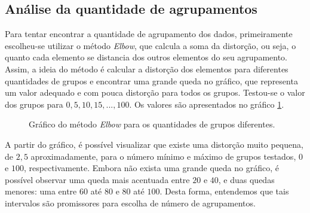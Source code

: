 \documentclass[conference]{IEEEtran}
\begin{document}
\subsection{Análise da quantidade de agrupamentos}

Para tentar encontrar a quantidade de agrupamento dos dados, primeiramente escolheu-se utilizar o método \emph{Elbow}, que calcula a soma da distorção, ou seja, o quanto cada elemento se distancia dos outros elementos do seu agrupamento. Assim, a ideia do método é calcular a distorção dos elementos para diferentes quantidades de grupos e encontrar uma grande queda no gráfico, que representa um valor adequado e com pouca distorção para todos os grupos. Testou-se o valor dos grupos para $0, 5, 10, 15, ..., 100$. Os valores são apresentados no gráfico \ref{fig:elbow}.

\begin{figure}[!h]
	\centering
	{
	}
	\caption{\small Gráfico do método \emph{Elbow} para os quantidades de grupos diferentes.}
	\label{fig:elbow}
\end{figure}

A partir do gráfico, é possível visualizar que existe uma distorção muito pequena, de $2,5$ aproximadamente, para o número mínimo e máximo de grupos testados, $0$ e $100$, respectivamente. Embora não exista uma grande queda no gráfico, é possível observar uma queda mais acentuada entre $20$ e $40$, e duas quedas menores: uma entre $60$ até $80$ e $80$ até $100$. Desta forma, entendemos que tais intervalos são promissores para escolha de número de agrupamentos.
\end{document}
